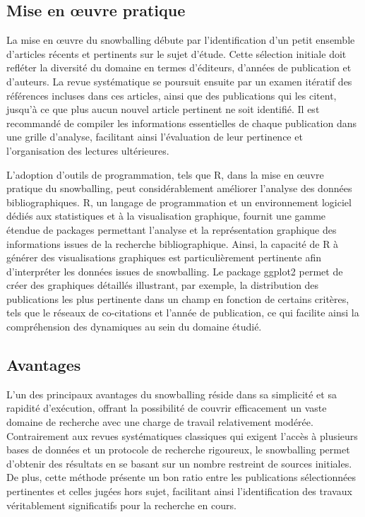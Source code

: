 \documentclass[
  letterpaper,
  DIV=11,
  numbers=noendperiod]{scrreprt}
\begin{document}
\subsection{Mise en œuvre pratique}\label{mise-en-ux153uvre-pratique}

La mise en œuvre du snowballing débute par l'identification d'un petit
ensemble d'articles récents et pertinents sur le sujet d'étude. Cette
sélection initiale doit refléter la diversité du domaine en termes
d'éditeurs, d'années de publication et d'auteurs. La revue systématique
se poursuit ensuite par un examen itératif des références incluses dans
ces articles, ainsi que des publications qui les citent, jusqu'à ce que
plus aucun nouvel article pertinent ne soit identifié. Il est recommandé
de compiler les informations essentielles de chaque publication dans une
grille d'analyse, facilitant ainsi l'évaluation de leur pertinence et
l'organisation des lectures ultérieures.

L'adoption d'outils de programmation, tels que R, dans la mise en œuvre
pratique du snowballing, peut considérablement améliorer l'analyse des
données bibliographiques. R, un langage de programmation et un
environnement logiciel dédiés aux statistiques et à la visualisation
graphique, fournit une gamme étendue de packages permettant l'analyse et
la représentation graphique des informations issues de la recherche
bibliographique. Ainsi, la capacité de R à générer des visualisations
graphiques est particulièrement pertinente afin d'interpréter les
données issues de snowballing. Le package ggplot2 permet de créer des
graphiques détaillés illustrant, par exemple, la distribution des
publications les plus pertinente dans un champ en fonction de certains
critères, tels que le réseaux de co-citations et l'année de publication,
ce qui facilite ainsi la compréhension des dynamiques au sein du domaine
étudié.

\subsection{Avantages}\label{avantages-1}

L'un des principaux avantages du snowballing réside dans sa simplicité
et sa rapidité d'exécution, offrant la possibilité de couvrir
efficacement un vaste domaine de recherche avec une charge de travail
relativement modérée. Contrairement aux revues systématiques classiques
qui exigent l'accès à plusieurs bases de données et un protocole de
recherche rigoureux, le snowballing permet d'obtenir des résultats en se
basant sur un nombre restreint de sources initiales. De plus, cette
méthode présente un bon ratio entre les publications sélectionnées
pertinentes et celles jugées hors sujet, facilitant ainsi
l'identification des travaux véritablement significatifs pour la
recherche en cours.
\end{document}
